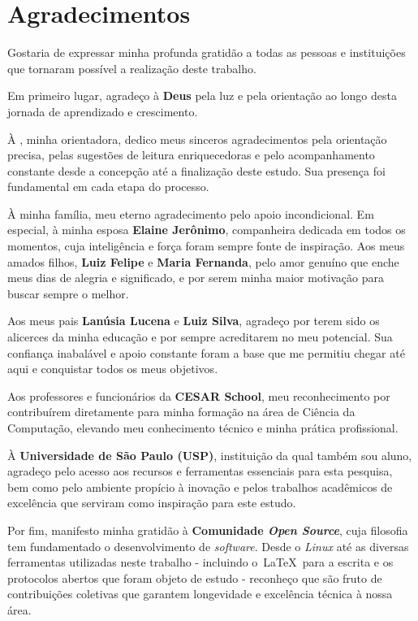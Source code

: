 \chapter*{Agradecimentos}
\thispagestyle{empty}

Gostaria de expressar minha profunda gratidão a todas as pessoas e instituições que tornaram possível a realização deste trabalho.

Em primeiro lugar, agradeço à \textbf{Deus} pela luz e pela orientação ao longo desta jornada de aprendizado e crescimento.

À \textbf{\orientadora}, minha orientadora, dedico meus sinceros agradecimentos pela orientação precisa, pelas sugestões de leitura enriquecedoras e pelo acompanhamento constante desde a concepção até a finalização deste estudo. Sua presença foi fundamental em cada etapa do processo.

À minha família, meu eterno agradecimento pelo apoio incondicional. Em especial, à minha esposa \textbf{Elaine Jerônimo}, companheira dedicada em todos os momentos, cuja inteligência e força foram sempre fonte de inspiração. Aos meus amados filhos, \textbf{Luiz Felipe} e \textbf{Maria Fernanda}, pelo amor genuíno que enche meus dias de alegria e significado, e por serem minha maior motivação para buscar sempre o melhor.

Aos meus pais \textbf{Lanúsia Lucena} e \textbf{Luiz Silva}, agradeço por terem sido os alicerces da minha educação e por sempre acreditarem no meu potencial. Sua confiança inabalável e apoio constante foram a base que me permitiu chegar até aqui e conquistar todos os meus objetivos.

Aos professores e funcionários da \textbf{CESAR School}, meu reconhecimento por contribuírem diretamente para minha formação na área de Ciência da Computação, elevando meu conhecimento técnico e minha prática profissional.

À \textbf{Universidade de São Paulo (USP)}, instituição da qual também sou aluno, agradeço pelo acesso aos recursos e ferramentas essenciais para esta pesquisa, bem como pelo ambiente propício à inovação e pelos trabalhos acadêmicos de excelência que serviram como inspiração para este estudo.

Por fim, manifesto minha gratidão à \textbf{Comunidade \textit{Open Source}}, cuja filosofia tem fundamentado o desenvolvimento de \textit{software}. Desde o \textit{Linux} até as diversas ferramentas utilizadas neste trabalho - incluindo o~\LaTeX~para a escrita e os protocolos abertos que foram objeto de estudo - reconheço que são fruto de contribuições coletivas que garantem longevidade e excelência técnica à nossa área.
